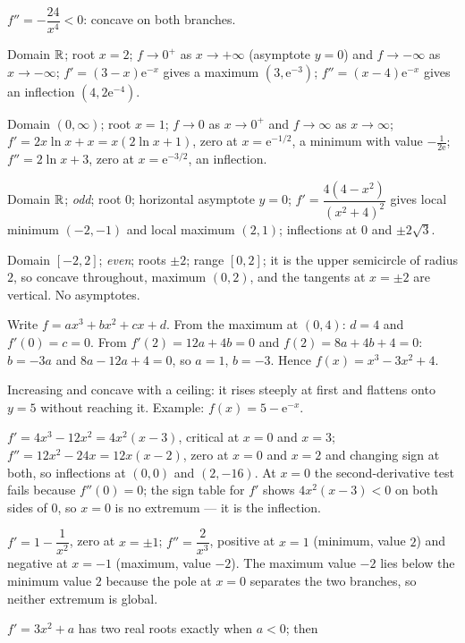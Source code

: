 \begin{solutions}
        $f''=-\dfrac{24}{x^{4}}<0$: concave on both branches.
  \item Domain $\mathbb{R}$; root $x=2$; $f\to0^{+}$ as $x\to+\infty$
        (asymptote $y=0$) and $f\to-\infty$ as $x\to-\infty$;
        $f'=(3-x)\mathrm{e}^{-x}$ gives a maximum
        $(3,\mathrm{e}^{-3})$; $f''=(x-4)\mathrm{e}^{-x}$ gives an
        inflection $(4,2\mathrm{e}^{-4})$.
  \item Domain $(0,\infty)$; root $x=1$; $f\to0$ as $x\to0^{+}$ and
        $f\to\infty$ as $x\to\infty$; $f'=2x\ln x+x=x(2\ln x+1)$, zero at
        $x=\mathrm{e}^{-1/2}$, a minimum with value
        $-\tfrac{1}{2\mathrm{e}}$; $f''=2\ln x+3$, zero at
        $x=\mathrm{e}^{-3/2}$, an inflection.
  \item Domain $\mathbb{R}$; \emph{odd}; root $0$; horizontal asymptote $y=0$;
        $f'=\dfrac{4(4-x^{2})}{(x^{2}+4)^{2}}$ gives local minimum
        $(-2,-1)$ and local maximum $(2,1)$; inflections at $0$ and
        $\pm2\sqrt3$.
  \item Domain $[-2,2]$; \emph{even}; roots $\pm2$; range $[0,2]$; it is
        the upper semicircle of radius $2$, so concave throughout, maximum
        $(0,2)$, and the tangents at $x=\pm2$ are vertical. No asymptotes.
  \item Write $f=ax^{3}+bx^{2}+cx+d$. From the maximum at $(0,4)$:
        $d=4$ and $f'(0)=c=0$. From $f'(2)=12a+4b=0$ and $f(2)=8a+4b+4=0$:
        $b=-3a$ and $8a-12a+4=0$, so $a=1$, $b=-3$. Hence
        $f(x)=x^{3}-3x^{2}+4$.
  \item Increasing and concave with a ceiling: it rises steeply at first
        and flattens onto $y=5$ without reaching it. Example:
        $f(x)=5-\mathrm{e}^{-x}$.
  \item $f'=4x^{3}-12x^{2}=4x^{2}(x-3)$, critical at $x=0$ and $x=3$;
        $f''=12x^{2}-24x=12x(x-2)$, zero at $x=0$ and $x=2$ and changing
        sign at both, so inflections at $(0,0)$ and $(2,-16)$. At $x=0$ the
        second-derivative test fails because $f''(0)=0$; the sign table for
        $f'$ shows $4x^{2}(x-3)<0$ on both sides of $0$, so $x=0$ is no
        extremum --- it is the inflection.
  \item $f'=1-\dfrac{1}{x^{2}}$, zero at $x=\pm1$;
        $f''=\dfrac{2}{x^{3}}$, positive at $x=1$ (minimum, value $2$) and
        negative at $x=-1$ (maximum, value $-2$). The maximum value $-2$
        lies below the minimum value $2$ because the pole at $x=0$
        separates the two branches, so neither extremum is global.
  \item $f'=3x^{2}+a$ has two real roots exactly when $a<0$; then

\end{solutions}

